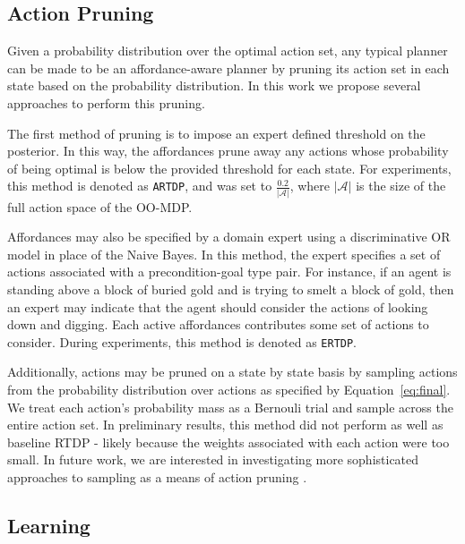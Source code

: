 \documentclass[conference]{IEEEtran}
\newcommand{\enote}[1]{\textcolor{Red}{\textbf{}}}
\begin{document}
\subsection{Action Pruning}
\label{sec:action_pruning}
Given a probability distribution over the optimal action set, any typical
planner can be made to be an affordance-aware planner by pruning its action
set in each state based on the probability distribution. In this work we propose several
approaches to perform this pruning.

The first method of pruning is to impose an expert defined threshold on the posterior. In this way, the affordances prune away any actions whose probability of being optimal is below the provided threshold for each state. For experiments, this method is denoted as \texttt{ARTDP}, and was set to $\frac{0.2}{|\mathcal{A}|}$, where $|\mathcal{A}|$ is the size of the full action space of the OO-MDP.

Affordances may also be specified by a domain expert using a discriminative OR model in place of the Naive Bayes. In this method, the expert specifies a set of actions associated with a precondition-goal type pair. For instance, if an agent is standing above a block of buried gold and is trying to smelt a block of gold, then an expert may indicate that the agent should consider the actions of looking down and digging. Each active affordances contributes some set of actions to consider. During experiments, this method is denoted as \texttt{ERTDP}.

Additionally, actions may be pruned on a state by state basis by sampling actions from the probability distribution over actions as specified by Equation~\ref{eq:final}. We treat each action's probability mass as a Bernouli trial and sample across the entire action set. In preliminary results, this method did not perform as well as baseline RTDP - likely because the weights associated with each action were too small. In future work, we are interested in investigating more sophisticated approaches to sampling as a means of action pruning 
\enote{I'm a bit uncomfortable with us jumping the gun and talking about results and then future work here -- I think this paragraph is good but we should shift the content towards the end to the correct sections.}.

\subsection{Learning}
\enote{I feel as though learning should go before action pruning since it specifies the action prior that is then used for pruning as detailed in Action Pruning.}
\end{document}
